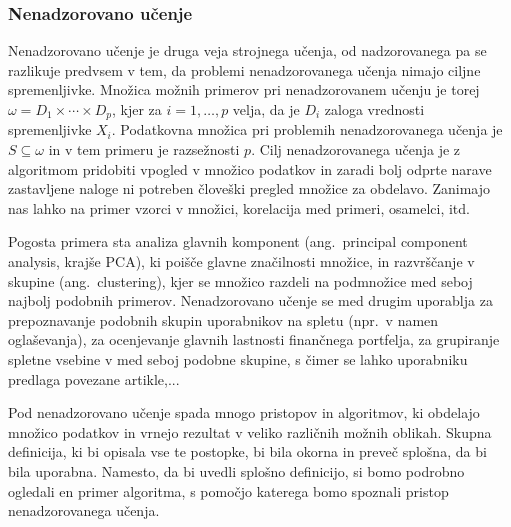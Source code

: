 \documentclass[12pt,a4paper,twoside]{article}
\theoremstyle{definition} %
\theoremstyle{plain} %
\numberwithin{equation}{section}  %
\begin{document}

\subsubsection{Nenadzorovano učenje}

Nenadzorovano učenje je druga veja strojnega učenja, od nadzorovanega pa se razlikuje predvsem v tem, da problemi nenadzorovanega učenja nimajo ciljne spremenljivke. 
Množica možnih primerov pri nenadzorovanem učenju je torej $\omega = D_1 \times \cdots \times D_p$, kjer za $i= 1,\ldots, p$ velja, da je $D_i$ zaloga vrednosti spremenljivke $X_i$. 
Podatkovna množica pri problemih nenadzorovanega učenja je $S \subseteq \omega$ in v tem primeru je razsežnosti $p$. 
Cilj nenadzorovanega učenja je z algoritmom pridobiti vpogled v množico podatkov in zaradi bolj odprte narave zastavljene naloge ni potreben človeški pregled množice za obdelavo. 
Zanimajo nas lahko na primer vzorci v množici, korelacija med primeri, osamelci, itd.

Pogosta primera sta analiza glavnih komponent (ang.~principal component analysis, krajše PCA), ki poišče glavne značilnosti množice, 
in razvrščanje v skupine (ang.~clustering), kjer se množico razdeli na podmnožice med seboj najbolj podobnih primerov. 
Nenadzorovano učenje se med drugim uporablja za prepoznavanje podobnih skupin uporabnikov na spletu (npr.\ v namen oglaševanja), 
za ocenjevanje glavnih lastnosti finančnega portfelja, za grupiranje spletne vsebine v med seboj podobne skupine, s čimer se lahko uporabniku predlaga povezane artikle,...

Pod nenadzorovano učenje spada mnogo pristopov in algoritmov, ki obdelajo množico podatkov in vrnejo rezultat v veliko različnih možnih oblikah. Skupna definicija, ki bi opisala vse te postopke, bi bila okorna in preveč splošna, da bi bila uporabna. Namesto, da bi uvedli splošno definicijo, si bomo podrobno ogledali en primer algoritma, s pomočjo katerega bomo spoznali pristop nenadzorovanega učenja.
\end{document}
